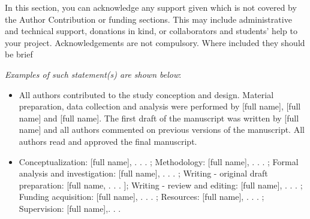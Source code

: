 \documentclass[12pt]{sn-jnl}%
\theoremstyle{thmstyleone}%
\theoremstyle{thmstyletwo}%
\theoremstyle{thmstylethree}%
\begin{document}



\maketitle
\backmatter

In this section, you can acknowledge any support given which is not covered by the Author
Contribution or funding sections. This may include administrative and technical support,
donations in kind, or collaborators and students’ help to your project. Acknowledgements
are not compulsory. Where included they should be brief

\textit{Examples of such statement(s) are shown below}:
\begin{itemize}
\item All authors contributed to the study conception and design. Material preparation, data collection and analysis were performed by [full name], [full name] and [full name].
The first draft of the manuscript was written by [full name] and all authors commented on
previous versions of the manuscript. All authors read and approved the final manuscript.
\item Conceptualization: [full name], . . . ; Methodology: [full name], . . . ; Formal analysis and
investigation: [full name], . . . ; Writing - original draft preparation: [full name, . . . ]; Writing
- review and editing: [full name], . . . ; Funding acquisition: [full name], . . . ; Resources:
[full name], . . . ; Supervision: [full name],. . . 

\end{itemize}
\end{document}
